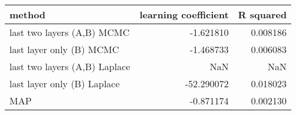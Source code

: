 \begin{tabular}{lrr}
\toprule
                        method &  learning coefficient &  R squared \\
\midrule
    last two layers (A,B) MCMC &             -1.621810 &   0.008186 \\
      last layer only (B) MCMC &             -1.468733 &   0.006083 \\
 last two layers (A,B) Laplace &                   NaN &        NaN \\
   last layer only (B) Laplace &            -52.290072 &   0.018023 \\
                           MAP &             -0.871174 &   0.002130 \\
\bottomrule
\end{tabular}

